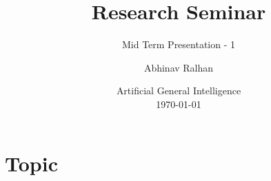 \documentclass[
	11pt, %
]{beamer}
\title[Research Seminar]{Research Seminar} %
\subtitle{Mid Term Presentation - 1} %
\author[Abhinav Ralhan]{Abhinav Ralhan} %
\institute[UniKo]{University of Koblenz \\ \smallskip \textit{abhinavr8@uni-koblenz.de}} %
\date[\today]{Artificial General Intelligence \\ \today} %
\begin{document}

\begin{frame}
	\titlepage %
\end{frame}

\section{Topic} %
\end{document}
